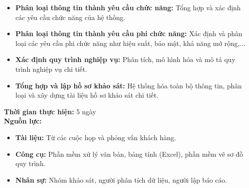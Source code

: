 {\begin{minipage}{\textwidth}
\begin{itemize}
\begin{itemize}
            \item \textbf{Phân loại thông tin thành yêu cầu chức năng:} Tổng hợp và xác định các yêu cầu chức năng của hệ thống.
            \item \textbf{Phân loại thông tin thành yêu cầu phi chức năng:} Xác định và phân loại các yêu cầu phi chức năng như hiệu suất, bảo mật, khả năng mở rộng,...
            \item \textbf{Xác định quy trình nghiệp vụ:} Phân tích, mô hình hóa và mô tả quy trình nghiệp vụ chi tiết.
            \item \textbf{Tổng hợp và lập hồ sơ khảo sát:} Hệ thống hóa toàn bộ thông tin, phân loại và xây dựng tài liệu hồ sơ khảo sát chi tiết.
        \end{itemize}
    \end{itemize}
    \noindent \textbf{Thời gian thực hiện:} 5 ngày \\
    \noindent \textbf{Nguồn lực:}
    \begin{itemize}
        \item \textbf{Tài liệu:} Từ các cuộc họp và phỏng vấn khách hàng.
        \item \textbf{Công cụ:} Phần mềm xử lý văn bản, bảng tính (Excel), phần mềm vẽ sơ đồ quy trình.
        \item \textbf{Nhân sự:} Nhóm khảo sát, người phân tích dữ liệu, người lập báo cáo.
    \end{itemize}
    \end{minipage}
}
\newpage %
